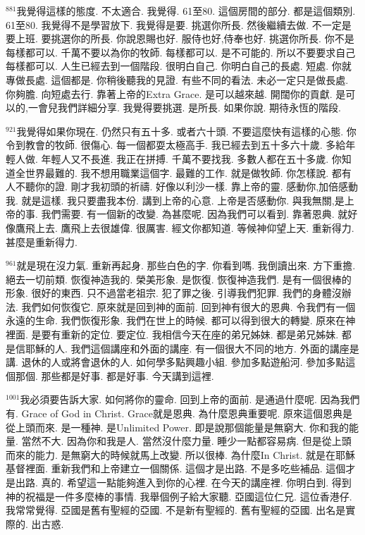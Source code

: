 \documentclass{book}
\begin{document}
$^{881}$我覺得這樣的態度.
不太適合.
我覺得.
61至80.
這個房間的部分.
都是這個類別.
61至80.
我覺得不是學習放下.
我覺得是要.
挑選你所長.
然後繼續去做.
不一定是要上班.
要挑選你的所長.
你說恩賜也好.
服侍也好,侍奉也好.
挑選你所長.
你不是每樣都可以.
千萬不要以為你的牧師.
每樣都可以.
是不可能的.
所以不要要求自己每樣都可以.
人生已經去到一個階段.
很明白自己.
你明白自己的長處.
短處.
你就專做長處.
這個都是.
你稍後聽我的見證.
有些不同的看法.
未必一定只是做長處.
你夠膽.
向短處去行.
靠著上帝的Extra Grace.
是可以越來越.
開闊你的貢獻.
是可以的,一會兒我們詳細分享.
我覺得要挑選.
是所長.
如果你說.
期待永恆的階段.

$^{921}$我覺得如果你現在.
仍然只有五十多.
或者六十頭.
不要這麼快有這樣的心態.
你令到教會的牧師.
很傷心.
每一個都耍太極高手.
我已經去到五十多六十歲.
多給年輕人做.
年輕人又不長進.
我正在拼搏.
千萬不要找我.
多數人都在五十多歲.
你知道全世界最難的.
我不想用職業這個字.
最難的工作.
就是做牧師.
你怎樣說.
都有人不聽你的證.
剛才我初頭的祈禱.
好像以利沙一樣.
靠上帝的靈.
感動你,加倍感動我.
就是這樣.
我只要盡我本份.
講到上帝的心意.
上帝是否感動你.
與我無關,是上帝的事.
我們需要.
有一個新的改變.
為甚麼呢.
因為我們可以看到.
靠著恩典.
就好像鷹飛上去.
鷹飛上去很雄偉.
很厲害.
經文你都知道.
等候神仰望上天.
重新得力.
甚麼是重新得力.

$^{961}$就是現在沒力氣.
重新再起身.
那些白色的字.
你看到嗎.
我倒讀出來.
方下重擔.
絕去一切前類.
恢復神造我的.
榮美形象.
是恢復.
恢復神造我們.
是有一個很棒的形象.
很好的東西.
只不過當老祖宗.
犯了罪之後.
引導我們犯罪.
我們的身體沒辦法.
我們如何恢復它.
原來就是回到神的面前.
回到神有很大的恩典.
令我們有一個永遠的生命.
我們恢復形象.
我們在世上的時候.
都可以得到很大的轉變.
原來在神裡面.
是要有重新的定位.
要定位.
我相信今天在座的弟兄姊妹.
都是弟兄姊妹.
都是信耶穌的人.
我們這個講座和外面的講座.
有一個很大不同的地方.
外面的講座是講.
退休的人或將會退休的人.
如何學多點興趣小組.
參加多點遊船河.
參加多點這個那個.
那些都是好事.
都是好事.
今天講到這裡.

$^{1001}$我必須要告訴大家.
如何將你的靈命.
回到上帝的面前.
是通過什麼呢.
因為我們有.
Grace of God in Christ.
Grace就是恩典.
為什麼恩典重要呢.
原來這個恩典是從上頭而來.
是一種神.
是Unlimited Power.
即是說那個能量是無窮大.
你和我的能量.
當然不大.
因為你和我是人.
當然沒什麼力量.
睡少一點都容易病.
但是從上頭而來的能力.
是無窮大的時候就馬上改變.
所以很棒.
為什麼In Christ.
就是在耶穌基督裡面.
重新我們和上帝建立一個關係.
這個才是出路.
不是多吃些補品.
這個才是出路.
真的.
希望這一點能夠進入到你的心裡.
在今天的講座裡.
你明白到.
得到神的祝福是一件多麼棒的事情.
我舉個例子給大家聽.
亞國這位仁兄.
這位香港仔.
我常常覺得.
亞國是舊有聖經的亞國.
不是新有聖經的.
舊有聖經的亞國.
出名是實際的.
出古惑.
\end{document}
